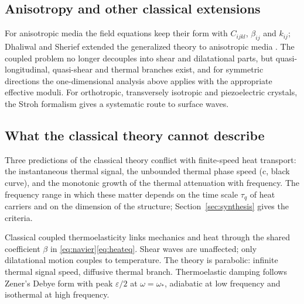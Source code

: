 \subsection{Anisotropy and other classical extensions}
For anisotropic media the field equations keep their form with $C_{ijkl}$, $\beta_{ij}$ and $k_{ij}$; Dhaliwal and Sherief extended the generalized theory to anisotropic media \citep{Dhaliwal1980}. The coupled problem no longer decouples into shear and dilatational parts, but quasi-longitudinal, quasi-shear and thermal branches exist, and for symmetric directions the one-dimensional analysis above applies with the appropriate effective moduli. For orthotropic, transversely isotropic and piezoelectric crystals, the Stroh formalism \citep{Stroh1958,Stroh1962} gives a systematic route to surface waves.

\subsection{What the classical theory cannot describe}
Three predictions of the classical theory conflict with finite-speed heat transport: the instantaneous thermal signal, the unbounded thermal phase speed (c, black curve), and the monotonic growth of the thermal attenuation with frequency. The frequency range in which these matter depends on the time scale $\tau_q$ of heat carriers and on the dimension of the structure; Section~\ref{sec:synthesis} gives the criteria.

\begin{summarybox}[Summary]
Classical coupled thermoelasticity links mechanics and heat through the shared coefficient $\beta$ in \eqref{eq:navier}\textendash\eqref{eq:heateq}. Shear waves are unaffected; only dilatational motion couples to temperature. The theory is parabolic: infinite thermal signal speed, diffusive thermal branch. Thermoelastic damping follows Zener's Debye form with peak $\varepsilon/2$ at $\omega=\omega_*$, adiabatic at low frequency and isothermal at high frequency.
\end{summarybox}
